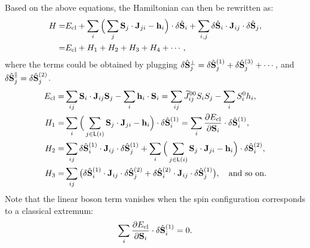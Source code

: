 Based on the above equations, the Hamiltonian can then be rewritten as:
\begin{equation}
    \begin{split}
        H = & E_{\rm cl}
        + \sum_{i} \Big( \sum_{j} \mathbf{S}_{j} \cdot \mathbf{J}_{ji} - \mathbf{h}_{i} \Big) \cdot \delta \hat{\mathbf{S}}_{i}
        + \sum_{i,j} \delta \hat{\mathbf{S}}_{i} \cdot \mathbf{J}_{ij} \cdot \delta \hat{\mathbf{S}}_{j}, \\
        = & E_{\rm cl} + H_{1} + H_{2} + H_{3} + H_{4} + \cdots,
    \end{split}
\end{equation}
where the terms could be obtained by plugging $\delta \hat{\bf S}_{j}^{\perp} = \delta \hat{\mathbf{S}}_{j}^{(1)} + \delta \hat{\mathbf{S}}_{j}^{(3)} + \cdots$, and $\delta \hat{\bf S}_{j}^{\parallel} = \delta \hat{\bf S}_{j}^{(2)}$.
\begin{equation}
    \begin{split}
        E_{\rm cl} 
        = & \sum_{ij} \mathbf{S}_i \cdot \mathbf{J}_{ij} \mathbf{S}_j - \sum_{i} \mathbf{h}_{i} \cdot \mathbf{S}_{i}
        = \sum_{ij}  \widetilde{J}_{ij}^{00} S_{i} S_{j} - \sum_{i} S_{i}^{0} h_{i}, \\
        H_{1} = & \sum_{i} \Big( \sum_{j \in \mathsf{L}(i)} \mathbf{S}_{j} \cdot \mathbf{J}_{ji} - \mathbf{h}_{i} \Big) \cdot \delta \hat{\mathbf{S}}_{i}^{(1)} 
        = \sum_{i} \frac{\partial E_{\rm cl}}{\partial \mathbf{S}_{i}} \cdot \delta \hat{\mathbf{S}}_{i}^{(1)}, \\
        H_{2} = & \sum_{ij} \delta \hat{\mathbf{S}}_{i}^{(1)} \cdot \mathbf{J}_{ij} \cdot \delta \hat{\mathbf{S}}_{j}^{(1)} 
        + \sum_{i} \Big( \sum_{j\in \mathsf{L}(i)} \mathbf{S}_{j} \cdot \mathbf{J}_{ji} - \mathbf{h}_{i} \Big) \cdot \delta \hat{\mathbf{S}}_{i}^{(2)}, \\
        H_{3} = & \sum_{ij} \big( \delta \hat{\mathbf{S}}_{i}^{(1)} \cdot \mathbf{J}_{ij} \cdot \delta \hat{\mathbf{S}}_{j}^{(2)} + \delta \hat{\mathbf{S}}_{i}^{(2)} \cdot \mathbf{J}_{ij} \cdot \delta \hat{\mathbf{S}}_{j}^{(1)} \big), 
        \quad \text{and so on.} 
    \end{split}
\end{equation}
Note that the linear boson term vanishes when the spin configuration corresponds to a classical extremum:
\begin{equation}
    \sum_{i} \frac{\partial E_{\rm cl}}{\partial \mathbf{S}_{i}} \cdot \delta \hat{\mathbf{S}}_{i}^{(1)} = 0.
\end{equation}
